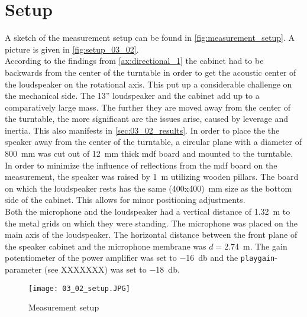 \section*{Setup}
A sketch of the measurement setup can be found in \autoref{fig:measurement_setup}. A picture is given in \autoref{fig:setup_03_02}. \\
According to the findings from \autoref{ax:directional_1} the cabinet had to be backwards from the center of the turntable in order to get the acoustic center of the loudspeaker on the rotational axis. This put up a considerable challenge on the mechanical side.
The 13'' loudspeaker and the cabinet add up to a comparatively large mass. The further they are moved away from the center of the turntable, the more significant are the issues arise, caused by leverage and inertia. This also manifests in \autoref{sec:03_02_results}.
In order to place the the speaker away from the center of the turntable, a circular plane with a diameter of \SI{800}{\milli\meter} was cut out of \SI{12}{\milli\meter} thick \gls{mdf} board and mounted to the turntable. In order to minimize the influence of reflections from the \gls{mdf} board on the measurement, the speaker was raised by \SI{1}{\meter} utilizing wooden pillars. The board on which the loudspeaker rests has the same (400x400)\SI{}{\milli\meter} size as the bottom side of the cabinet. This allows for minor positioning adjustments.\\
Both the microphone and the loudspeaker had a vertical distance of \SI{1.32}{\meter} to the metal grids on which they were standing. The microphone was placed on the main axis of the loudspeaker. The horizontal distance between the front plane of the speaker cabinet and the microphone membrane was \(d=\)\SI{2.74}{\meter}.
The gain potentiometer of the power amplifier was set to \SI{-16}{\decibel} and the \texttt{playgain}-parameter (see XXXXXXX) was set to \SI{-18}{\decibel}.

\begin{figure}[htbp]
	\centering
	\texttt{[image: 03\_02\_setup.JPG]}
	\caption{Measurement setup}
		\label{fig:setup_03_02}
\end{figure}

